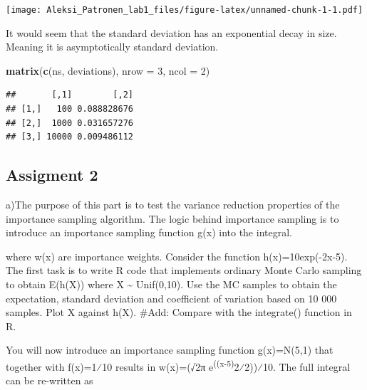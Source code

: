 \documentclass[
]{article}
\newenvironment{Shaded}{\begin{snugshade}}{\end{snugshade}}
\newcommand{\AttributeTok}[1]{\textcolor[rgb]{0.13,0.29,0.53}{#1}}
\newcommand{\DecValTok}[1]{\textcolor[rgb]{0.00,0.00,0.81}{#1}}
\newcommand{\FunctionTok}[1]{\textcolor[rgb]{0.13,0.29,0.53}{\textbf{#1}}}
\newcommand{\NormalTok}[1]{#1}
\begin{document}
\texttt{[image: Aleksi\_Patronen\_lab1\_files/figure-latex/unnamed-chunk-1-1.pdf]}

It would seem that the standard deviation has an exponential decay in
size. Meaning it is asymptotically standard deviation.

\begin{Shaded}
\begin{Highlighting}[]
\FunctionTok{matrix}\NormalTok{(}\FunctionTok{c}\NormalTok{(ns, deviations), }\AttributeTok{nrow =} \DecValTok{3}\NormalTok{, }\AttributeTok{ncol =} \DecValTok{2}\NormalTok{)}
\end{Highlighting}
\end{Shaded}

\begin{verbatim}
##       [,1]        [,2]
## [1,]   100 0.088828676
## [2,]  1000 0.031657276
## [3,] 10000 0.009486112
\end{verbatim}

\hypertarget{assigment-2}{%
\subsection{Assigment 2}\label{assigment-2}}

a)The purpose of this part is to test the variance reduction properties
of the importance sampling algorithm. The logic behind importance
sampling is to introduce an importance sampling function g(x) into the
integral.

where w(x) are importance weights. Consider the function
h(x)=10exp⁡(-2\textbar x-5\textbar). The first task is to write R code
that implements ordinary Monte Carlo sampling to obtain E(h(X)) where X
\textasciitilde{} Unif(0,10). Use the MC samples to obtain the
expectation, standard deviation and coefficient of variation based on 10
000 samples. Plot X against h(X). \#Add: Compare with the integrate()
function in R.

You will now introduce an importance sampling function g(x)=N⁡(5,1) that
together with f(x)=1⁄10 results in w(x)=(√2π
e\textsuperscript{((x-5)}2⁄2))⁄10. The full integral can be re-written
as
\end{document}
